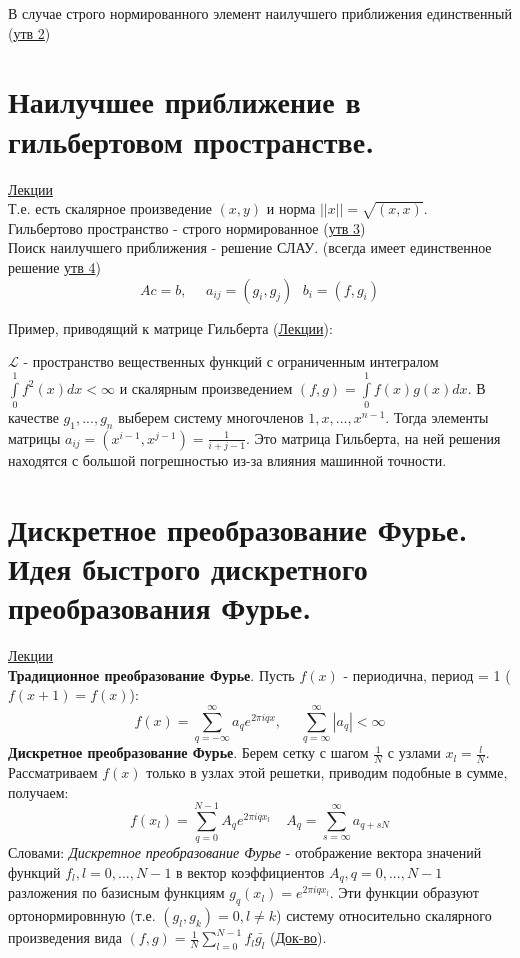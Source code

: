 \documentclass[specialist, subf, href, colorlinks=true, 12pt, times, mtpro, final]{disser}
\theoremstyle{definition}
\begin{document}
    В случае строго нормированного элемент наилучшего приближения единственный (\hyperlink {lects.29}{утв 2})

\section {Наилучшее приближение в гильбертовом пространстве.}
    \hyperlink {lects.29}{Лекции}\\
    Т.е. есть скалярное произведение $(x,y)$ и норма $||x||=\sqrt{(x,x)}$. \\
    Гильбертово пространство - строго нормированное (\hyperlink {lects.29}{утв 3}) \\
    
    Поиск наилучшего приближения - решение СЛАУ. (всегда имеет единственное решение \hyperlink {lects.30}{утв 4})
    $$
        Ac = b, \ \ \ \ \ \ a_{ij} = (g_i, g_j) \ \ \ b_i = (f, g_i)
    $$
    
    Пример, приводящий к матрице Гильберта (\hyperlink {lects.31}{Лекции}):
    
    $\mathcal{L}$ - пространство вещественных функций с ограниченным интегралом $\int\limits_0^1 f^2(x)dx < \infty $ и скалярным произведением $(f,g) = \int\limits_0^1 f(x)g(x)dx$. В качестве $g_1, ..., g_n$ выберем систему многочленов $1, x, ..., x^{n-1}$. Тогда элементы матрицы $a_{ij} = (x^{i-1},x^{j-1}) = \frac{1}{i+j-1}$. Это матрица Гильберта, на ней решения находятся с большой погрешностью из-за влияния машинной точности. 

\section {Дискретное преобразование Фурье. Идея быстрого дискретного преобразования Фурье.}
    \hyperlink {lects.32}{Лекции}\\
    \textbf{Традиционное преобразование Фурье}. Пусть $f(x)$ - периодична, период = 1 ($f(x+1) = f(x)$):
    $$
        f(x) = \sum\limits_{q = -\infty}^{\infty} a_q e^{2\pi i qx},  \ \ \  \ \ \ \sum\limits_{q = \infty}^{\infty}|a_q| < \infty
    $$
    \textbf{Дискретное преобразование Фурье}. Берем сетку с шагом $\frac{1}{N}$ с узлами $x_l = \frac{l}{N}$. Рассматриваем $f(x)$ только в узлах этой решетки, приводим подобные в сумме, получаем:
    $$
        f(x_l) = \sum\limits_{q = 0}^{N-1} A_q e^{2\pi i qx_l} \ \ \ \ \ A_q = \sum\limits_{s = \infty}^{\infty} a_{q+sN}
    $$
    Словами: \textit{Дискретное преобразование Фурье} - отображение вектора значений функций $f_l, l = 0, ..., N-1$ в вектор коэффициентов $A_q, q = 0, ..., N-1$ разложения по базисным функциям $g_q(x_l) = e^{2\pi i qx_l}$. Эти функции образуют ортонормировнную (т.е. $(g_l,g_k) = 0, l \ne k$) систему относительно скалярного произведения вида $(f,g) = \frac{1}{N}\sum\limits_{l = 0}^{N-1}f_l \bar{g_l}$ (\hyperlink {lects.32}{Док-во}). 
    
\end{document}
